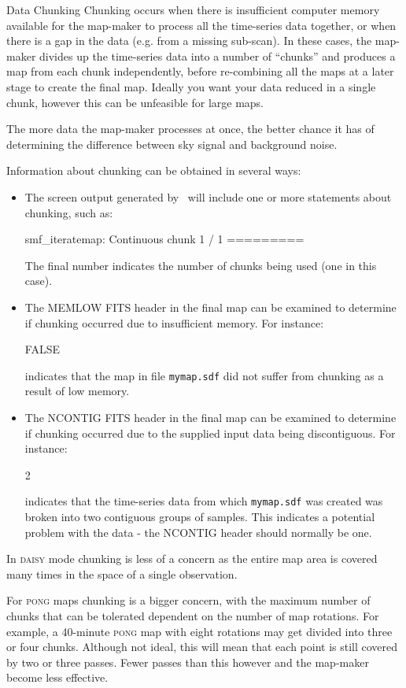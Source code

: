 \begin{sltextbox}{Data Chunking}
  \label{box:chunk}
  Chunking occurs when there is insufficient computer memory available
  for the map-maker to process all the time-series data together, or when
  there is a gap in the data (e.g.  from a missing sub-scan). In these
  cases, the map-maker divides up the time-series data into a number of
  ``chunks'' and produces a map from each chunk independently, before
  re-combining all the maps at a later stage to create the final map.
  Ideally you want your data reduced in a single chunk, however this can
  be unfeasible for large maps.

  The more data the map-maker processes at once, the better chance it
  has of determining the difference between sky signal and background
  noise.

  Information about chunking can be obtained in several ways:
  \begin{itemize}

  \item The screen output generated by \makemap\ will include one or more
  statements about chunking, such as:
  \begin{terminalv}
smf_iteratemap: Continuous chunk 1 / 1 =========
  \end{terminalv}
  The final number indicates the number of chunks being used (one in
  this case).

  \item The MEMLOW FITS header in the final map can be examined to
  determine if chunking occurred due to insufficient memory. For
  instance:
  \begin{terminalv}
FALSE
  \end{terminalv}
  indicates that the map in file \texttt{mymap.sdf} did not suffer from
  chunking as a result of low memory.

  \item The NCONTIG FITS header in the final map can be examined to
  determine if chunking occurred due to the supplied input data being
  discontiguous. For instance:
  \begin{terminalv}
2
  \end{terminalv}
  indicates that the time-series data from which \texttt{mymap.sdf} was
  created was broken into two contiguous groups of samples. This
  indicates a potential problem with the data - the NCONTIG header
  should normally be one.
  \end{itemize}

  In \textsc{daisy} mode chunking is less of a concern as the entire
  map area is covered many times in the space of a single observation.

  For \textsc{pong} maps chunking is a bigger concern, with the
  maximum number of chunks that can be tolerated dependent on the
  number of map rotations. For example, a 40-minute \textsc{pong} map
  with eight rotations may get divided into three or four
  chunks. Although not ideal, this will mean that each point is still
  covered by two or three passes. Fewer passes than this however and
  the map-maker become less effective.
\end{sltextbox}

